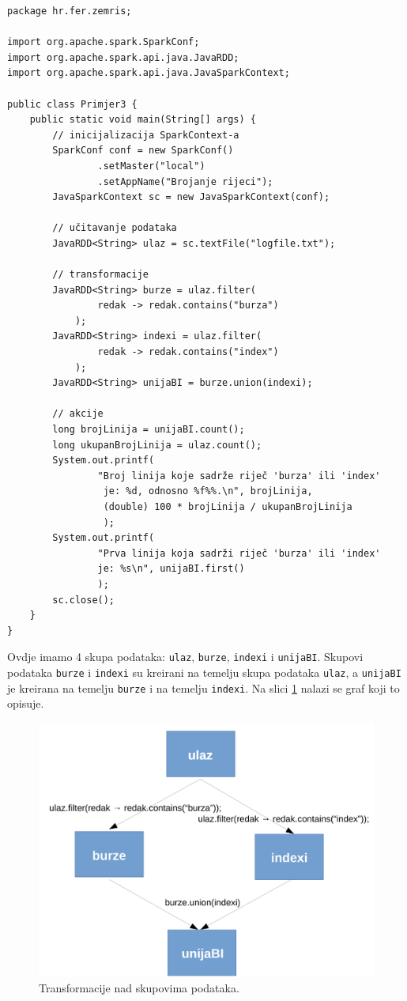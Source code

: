 \documentclass[times, utf8, zavrsni, numeric]{fer}
\begin{document}
\newpage
\begin{lstlisting}[label={lst:primjer3}, caption={Korištenje transformacija i akcija.}]
package hr.fer.zemris;

import org.apache.spark.SparkConf;
import org.apache.spark.api.java.JavaRDD;
import org.apache.spark.api.java.JavaSparkContext;

public class Primjer3 {
	public static void main(String[] args) {
		// inicijalizacija SparkContext-a
		SparkConf conf = new SparkConf()
				.setMaster("local")
				.setAppName("Brojanje rijeci");
		JavaSparkContext sc = new JavaSparkContext(conf);

		// učitavanje podataka
		JavaRDD<String> ulaz = sc.textFile("logfile.txt");

		// transformacije
		JavaRDD<String> burze = ulaz.filter(
				redak -> redak.contains("burza")
			);
		JavaRDD<String> indexi = ulaz.filter(
				redak -> redak.contains("index")
			);
		JavaRDD<String> unijaBI = burze.union(indexi);

		// akcije
		long brojLinija = unijaBI.count();
		long ukupanBrojLinija = ulaz.count();
		System.out.printf(
				"Broj linija koje sadrže riječ 'burza' ili 'index'
				 je: %d, odnosno %f%%.\n", brojLinija,
				 (double) 100 * brojLinija / ukupanBrojLinija
				 );
		System.out.printf(
				"Prva linija koja sadrži riječ 'burza' ili 'index'
				je: %s\n", unijaBI.first()
				);
		sc.close();
	}
}
\end{lstlisting}
\vspace{5mm}

Ovdje imamo 4 skupa podataka: \texttt{ulaz}, \texttt{burze}, \texttt{indexi} i \texttt{unijaBI}. Skupovi podataka \texttt{burze} i \texttt{indexi} su kreirani na temelju skupa podataka \texttt{ulaz}, a \texttt{unijaBI} je kreirana na temelju \texttt{burze} i na temelju \texttt{indexi}. Na slici \ref{fig:burzeUnijaIndexiRDD} nalazi se graf koji to opisuje.

\begin{figure}[htb]
\centering
\includegraphics[scale = 0.8]{img/transformacijeCropped.pdf}
\caption{Transformacije nad skupovima podataka.}
\label{fig:burzeUnijaIndexiRDD}
\end{figure}
\end{document}
